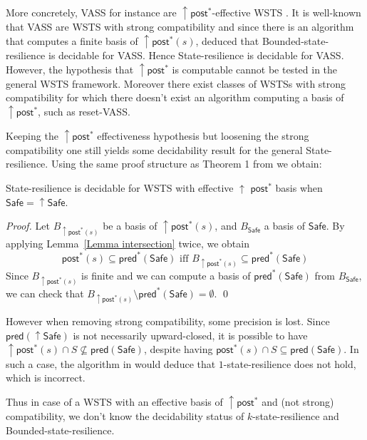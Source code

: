 \documentclass[runningheads]{llncs}
\newcommand{\pred}{\textsf{pred}}
\newcommand{\post}{\textsf{post}}
\newcommand{\Safe}{\textsf{Safe}}
\begin{document}
More concretely,
VASS for instance are $\uparrow \post^*$-effective WSTS \cite{DBLP:journals/corr/abs-2108-00889}. 
It is well-known that 
VASS are WSTS with strong compatibility and since there is an algorithm that computes a finite basis of  $\uparrow \post^*(s)$, \cite{DBLP:conf/gg/Ozkan22} deduced that {\sc Bounded-state-resilience} is decidable for VASS.
Hence {\sc State-resilience} is decidable for  
VASS.
However, the hypothesis that $\uparrow \post^*$ is computable cannot be tested in the general WSTS framework.  
Moreover there exist classes of WSTSs with strong 
 compatibility for which there doesn't exist an algorithm computing a basis of $\uparrow \post^*$, such as reset-VASS.

Keeping the $\uparrow \post^*$ effectiveness hypothesis but loosening the strong compatibility one still yields some decidability result for the general {\sc State-resilience}. Using the same proof structure as Theorem 1 from \cite{DBLP:journals/corr/abs-2108-00889} we obtain:


\begin{theorem}\label{post srp}
{\sc State-resilience} is decidable for 
 WSTS with effective 
$\uparrow$ $\post^*$ basis
when
$\Safe=\uparrow \Safe$. 
\end{theorem}


\begin{proof}
Let $B_{\uparrow \post^*(s)}$ 
 be a basis of $\uparrow \post^*(s)$, and $B_\Safe$ a basis of $\Safe$.
By applying Lemma~\ref{Lemma intersection} twice, we obtain
\[ \post^*(s) 
 \subseteq \pred^*(\Safe) \text{ iff } B_{\uparrow \post^*(s)}  
 \subseteq \pred^*(\Safe)\]
Since $B_{\uparrow \post^*(s)}$ is finite and we can compute a basis of $\pred^*(\Safe)$ from $B_\Safe$, we can check that $B_{\uparrow \post^*(s)} 
 \setminus \pred^*(\Safe) = \emptyset$.  \qed
\end{proof}





However when removing strong compatibility, some precision is lost.
Since $\pred(\uparrow \Safe)$ is not necessarily upward-closed, it is possible to have 
 $\uparrow \post^* (s) \cap S \not\subseteq \pred(\Safe)$,
despite having 
$\post^* (s) \cap S \subseteq \pred( \Safe)$.
In such a case, the algorithm in
\cite{DBLP:conf/gg/Ozkan22} would deduce that {\sc $1$-state-resilience} does not hold,
which is incorrect.

Thus in case of a WSTS with an effective basis of $\uparrow \post^*$ and (not strong) compatibility, we don't know the decidability status of {\sc $k$-state-resilience} and 
{\sc Bounded-state-resilience}. 
\end{document}

